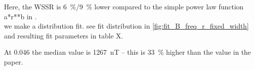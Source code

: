 %

Here, the WSSR is \SI{6}{\%}/\SI{9}{\%} lower compared to the simple power law function a*r**b in \citet{Venzmer2017}.\\

we make a distribution fit. see fit distribution in \autoref{fig:fit_B_freq_r_fixed_width} and resulting fit parameters in table X.\\
\begin{figure}[htb]
\end{figure}

At \SI{0.046}{\au} the median value is \SI{1267}{\nano\tesla} -- this is \SI{33}{\%} higher than the value in the paper.\\

